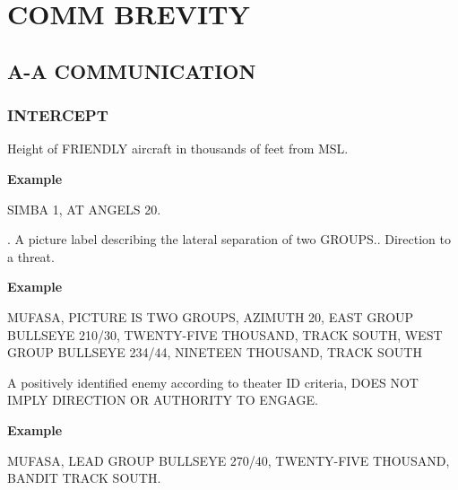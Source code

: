 \chapter{COMM BREVITY}
\localtableofcontents
\thispagestyle{plain}
\cleardoublepage

\section{A-A COMMUNICATION}

\subsection{INTERCEPT}

\begin{tcoloritemize}
    \blueitem[ANGELS]
    Height of FRIENDLY aircraft in thousands of feet from MSL.

    \medskip
    \textbf{Example}
    \begin{center}
        \begin{minipage}{0.9\textwidth}
            SIMBA 1, AT ANGELS 20.
        \end{minipage}
    \end{center}    

    . A picture label describing the lateral separation of two GROUPS.. Direction to a threat.

    \medskip
    \textbf{Example}
    \begin{center}
        \begin{minipage}{0.9\textwidth}
            MUFASA, PICTURE IS TWO GROUPS, AZIMUTH 20, EAST GROUP BULLSEYE 210/30, 
            TWENTY-FIVE THOUSAND,
            TRACK SOUTH,
            WEST GROUP BULLSEYE 234/44,
            NINETEEN THOUSAND,
            TRACK SOUTH 
        \end{minipage}
    \end{center}

    \blueitem[BANDIT]
    A positively identified enemy according to theater ID criteria, DOES NOT IMPLY DIRECTION OR AUTHORITY TO ENGAGE.

    \medskip
    \textbf{Example}
    \begin{center}
        \begin{minipage}{0.9\textwidth}
            MUFASA, LEAD GROUP BULLSEYE 270/40, 
            TWENTY-FIVE THOUSAND,
            BANDIT
            TRACK SOUTH.
        \end{minipage}
    \end{center}


\end{tcoloritemize}
